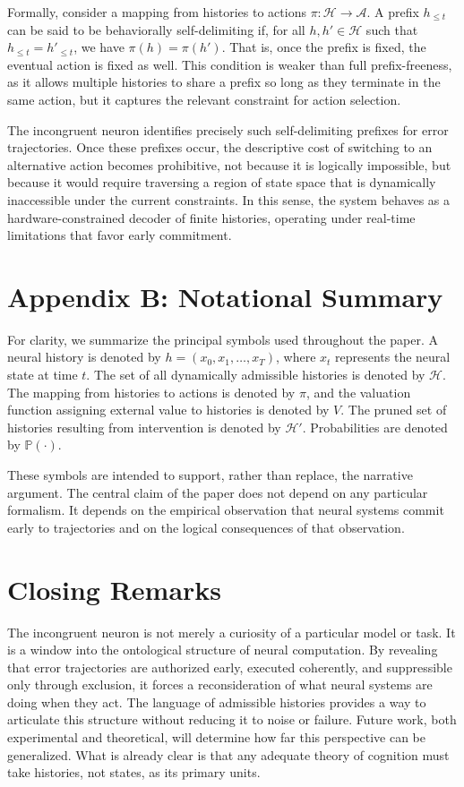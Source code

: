 \documentclass[11pt]{article}
\newcommand{\histories}{\mathcal{H}}
\newcommand{\valuation}{V}
\newcommand{\prob}{\mathbb{P}}
\begin{document}
Formally, consider a mapping from histories to actions $\pi : \histories \to \mathcal{A}$. A prefix $h_{\le t}$ can be said to be behaviorally self-delimiting if, for all $h, h' \in \histories$ such that $h_{\le t} = h'_{\le t}$, we have $\pi(h) = \pi(h')$. That is, once the prefix is fixed, the eventual action is fixed as well. This condition is weaker than full prefix-freeness, as it allows multiple histories to share a prefix so long as they terminate in the same action, but it captures the relevant constraint for action selection.

The incongruent neuron identifies precisely such self-delimiting prefixes for error trajectories. Once these prefixes occur, the descriptive cost of switching to an alternative action becomes prohibitive, not because it is logically impossible, but because it would require traversing a region of state space that is dynamically inaccessible under the current constraints. In this sense, the system behaves as a hardware-constrained decoder of finite histories, operating under real-time limitations that favor early commitment.

\section{Appendix B: Notational Summary}

For clarity, we summarize the principal symbols used throughout the paper. A neural history is denoted by $h = (x_0, x_1, \ldots, x_T)$, where $x_t$ represents the neural state at time $t$. The set of all dynamically admissible histories is denoted by $\histories$. The mapping from histories to actions is denoted by $\pi$, and the valuation function assigning external value to histories is denoted by $\valuation$. The pruned set of histories resulting from intervention is denoted by $\histories'$. Probabilities are denoted by $\prob(\cdot)$.

These symbols are intended to support, rather than replace, the narrative argument. The central claim of the paper does not depend on any particular formalism. It depends on the empirical observation that neural systems commit early to trajectories and on the logical consequences of that observation.

\section*{Closing Remarks}

The incongruent neuron is not merely a curiosity of a particular model or task. It is a window into the ontological structure of neural computation. By revealing that error trajectories are authorized early, executed coherently, and suppressible only through exclusion, it forces a reconsideration of what neural systems are doing when they act. The language of admissible histories provides a way to articulate this structure without reducing it to noise or failure. Future work, both experimental and theoretical, will determine how far this perspective can be generalized. What is already clear is that any adequate theory of cognition must take histories, not states, as its primary units.
\end{document}

